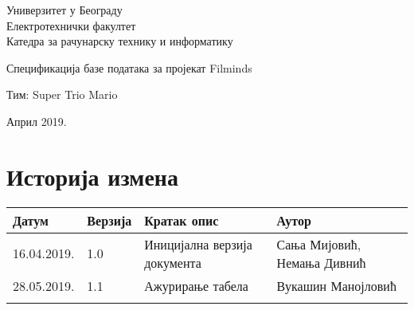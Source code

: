 \documentclass[12pt,a4paper]{article}
\begin{document}
\begin{titlepage}
\begin{center}
    Универзитет у Београду \\
    Електротехнички факултет \\
    Катедра за рачунарску технику и информатику \\
    \vfill

    {\fontsize{50}{60}\selectfont Спецификација базе података за пројекат Filminds }
    \vskip 0.6cm

    {\large Тим: Super Trio Mario}
    \vskip 0.3cm

    \vfill
    \vfill

    Април 2019.
    \hfill
\end{center}
\end{titlepage}

\section*{Историја измена}
\noindent
\setcellgapes{4pt}
\makegapedcells
\begin{tabularx}{\linewidth}{|l|l|X|X|}
    \hline
    \textbf{Датум} & \textbf{Верзија} & \textbf{Кратак опис} & \textbf{Аутор} \\
    \hline
    16.04.2019. & 1.0 & Иницијална верзија документа & Сања Мијовић, \newline Немања Дивнић \\
    \hline
    28.05.2019. & 1.1 & Ажурирање табела & Вукашин Манојловић \\
    \hline
    & & & \\
    \hline
\end{tabularx}
\newpage

\tableofcontents
\newpage




\end{document}
